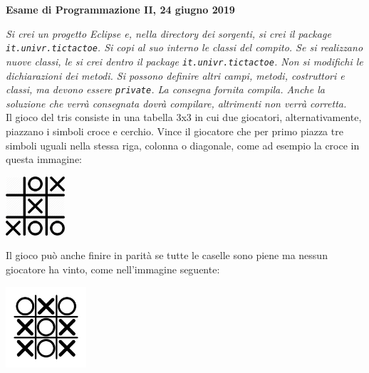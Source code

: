 \documentclass[12pt]{article}
\begin{document}
\begin{center} {\bf Esame di Programmazione II, 24 giugno 2019}\end{center}

\emph{
Si crei un progetto Eclipse e, nella directory dei sorgenti,
si crei il package \texttt{it.univr.tictactoe}. Si copi al suo interno
le classi del compito.
Se si realizzano nuove classi, le si crei dentro
il package \texttt{it.univr.tictactoe}.
Non si modifichi le dichiarazioni dei metodi. Si possono definire altri campi,
metodi, costruttori e classi, ma devono essere \texttt{private}.
La consegna fornita compila.
Anche la soluzione che verr\`a consegnata dovr\`a compilare,
altrimenti non verr\`a corretta.
}
\mbox{}\\

Il gioco del tris consiste in una tabella 3x3 in cui due giocatori,
alternativamente, piazzano i simboli croce e cerchio.
Vince il giocatore che per primo piazza tre simboli uguali nella
stessa riga, colonna o diagonale, come ad esempio la croce in questa immagine:
%
\begin{center}
\includegraphics[width=2.2cm]{tictactoe_wins.png}
\end{center}
%
Il gioco pu\`o anche finire in
parit\`a se tutte le caselle sono piene ma nessun giocatore ha vinto,
come nell'immagine seguente:
%
\begin{center}
\includegraphics[width=3cm]{tictactoe_draw.png}
\end{center}
\end{document}
